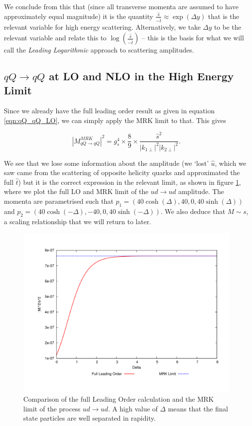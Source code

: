 We conclude from this that (since all transverse momenta are assumed to have approximately equal magnitude) it is the quantity $\frac{\hat{s}}{-\hat{t}} \approx \exp(\Delta y)$ that is the relevant variable for high energy scattering. Alternatively, we take $\Delta y$ to be the relevant variable and relate this to $\log(\frac{\hat{s}}{-\hat{t}})$ -- this is the basis for what we will call the \emph{Leading Logarithmic} approach to scattering amplitudes. 

\subsection{$qQ \to qQ$ at LO and NLO in the High Energy Limit}

Since we already have the full leading order result as given in equation \ref{eqn:qQ_qQ_LO}, we can simply apply the MRK limit to that. This gives

\begin{equation}
|M_{qQ\to qQ}^{MRK}|^2 = g_s^4 \times \frac{8}{9} \times \frac{\hat{s}^2}{|k_{1 \perp}|^2 |k_{2 \perp}|^2}.
\end{equation}

We see that we lose some information about the amplitude (we `lost' $\hat{u}$, which we saw came from the scattering of opposite helicity quarks and approximated the full $\hat{t}$) but it is the correct expression in the relevant limit, as shown in figure \ref{fig:qQ_LO_MRK}, where we plot the full LO and MRK limit of the $ud \to ud$ amplitude. The momenta are parametrised such that $p_1 =  \left(40 \cosh(\Delta), 40, 0, 40 \sinh(\Delta) \right)$ and $p_2 =  \left(40 \cosh(-\Delta), -40, 0, 40 \sinh(-\Delta) \right)$. We also deduce that $M \sim \hat{s}$, a scaling relationship that we will return to later.

\begin{figure}[t]
\centering
\includegraphics[scale=0.5]{Images/ud_ud_plots.pdf} 
\caption{Comparison of the full Leading Order calculation and the MRK limit of the process $ud \to ud$. A high value of $\Delta$ means that the final state particles are well separated in rapidity.}
\label{fig:qQ_LO_MRK}
\end{figure}

